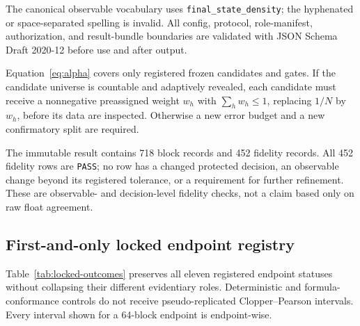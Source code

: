 The canonical observable vocabulary uses \texttt{final\_state\_density}; the hyphenated or
space-separated spelling is invalid. All config, protocol, role-manifest, authorization, and
result-bundle boundaries are validated with JSON Schema Draft 2020-12 before use and after output.

Equation~\eqref{eq:alpha} covers only registered frozen candidates and gates. If the candidate
universe is countable and adaptively revealed, each candidate must receive a nonnegative
preassigned weight \(w_h\) with \(\sum_hw_h\le1\), replacing \(1/N\) by \(w_h\), before its data
are inspected. Otherwise a new error budget and a new confirmatory split are required.

The immutable result contains 718 block records and 452 fidelity records. All 452 fidelity rows
are \texttt{PASS}; no row has a changed protected decision, an observable change beyond its
registered tolerance, or a requirement for further refinement. These are observable- and
decision-level fidelity checks, not a claim based only on raw float agreement.

\subsection{First-and-only locked endpoint registry}

Table~\ref{tab:locked-outcomes} preserves all eleven registered endpoint statuses without
collapsing their different evidentiary roles. Deterministic and formula-conformance controls do not
receive pseudo-replicated Clopper--Pearson intervals. Every interval shown for a 64-block endpoint
is endpoint-wise.

